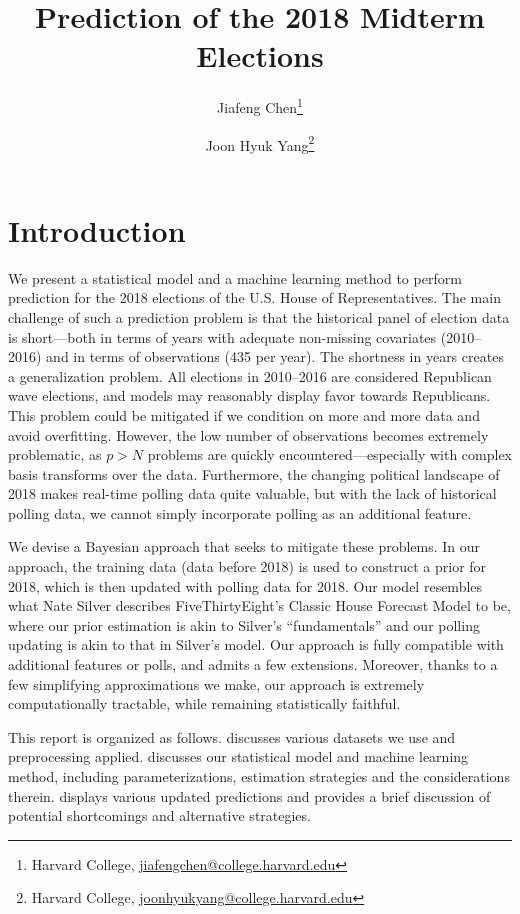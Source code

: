 \documentclass[11pt]{article}
\title{\sffamily\bfseries{Prediction of the 2018 Midterm Elections}}
\author{Jiafeng Chen\thanks{Harvard College, \url{jiafengchen@college.harvard.edu}} \and Joon Hyuk Yang\thanks{Harvard College, \url{joonhyukyang@college.harvard.edu}}}
\begin{document}
\maketitle
\section{Introduction}

We present a statistical model and a machine learning method to perform
prediction for the 2018 elections of the U.S. House of Representatives. The main
challenge of such a prediction problem is that the historical panel of election
data is short---both in terms of years with adequate non-missing covariates 
(2010--2016) and in terms of observations (435 per year). The shortness in years
creates a generalization problem. All elections in 2010--2016 are considered
Republican wave elections, and models may reasonably display favor towards
Republicans. This problem could be mitigated if we condition on more and more
data and avoid overfitting. However, the low number of observations becomes
extremely problematic, as $p > N$ problems are quickly encountered---especially
with complex basis transforms over the data. Furthermore, the changing political
landscape of 2018 makes real-time polling data quite valuable, but with the lack
of historical polling data, we cannot simply incorporate polling as an
additional feature.

We devise a Bayesian approach that seeks to mitigate these problems. In our
approach, the training data (data before 2018) is used to construct a prior for
2018, which is then updated with polling data for 2018. Our model resembles
what Nate Silver describes FiveThirtyEight's Classic House Forecast Model to
be, where our prior estimation is akin to Silver's ``fundamentals'' and our
polling updating is akin to that in Silver's model. Our approach is fully
compatible with additional features or polls, and admits a few extensions.
Moreover, thanks to a few simplifying approximations we make, our approach is
extremely computationally tractable, while remaining statistically faithful. 

This report is organized as follows.  discusses various datasets
we use and preprocessing applied.  discusses our statistical
model and machine learning method, including parameterizations, estimation
strategies and the considerations therein.  displays various
updated predictions and provides a brief discussion of potential shortcomings
and alternative strategies. 
\end{document}
